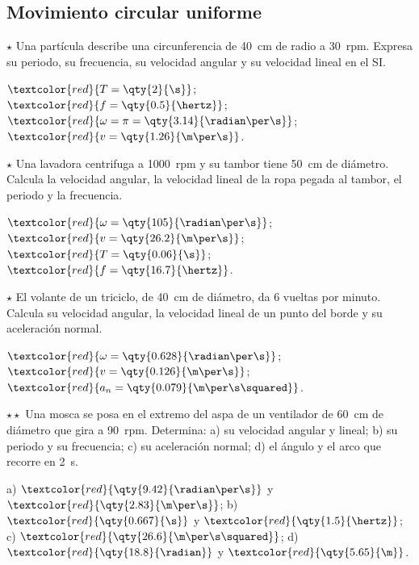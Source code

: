 \subsection{Movimiento circular uniforme}

\begin{exercise}
    \(\star\) Una partícula describe una circunferencia de \qty{40}{\cm} de radio a \qty{30}{rpm}. Expresa su periodo, su frecuencia,
    su velocidad angular y su velocidad lineal en el SI.
    \begin{solu}
        \(\textcolor{red}{T = \qty{2}{\s}}\); \(\textcolor{red}{f = \qty{0.5}{\hertz}}\); \(\textcolor{red}{\omega = \pi = \qty{3.14}{\radian\per\s}}\);
        \(\textcolor{red}{v = \qty{1.26}{\m\per\s}}\).
    \end{solu}
\end{exercise}

\begin{exercise}
    \(\star\) Una lavadora centrifuga a \qty{1000}{rpm} y su tambor tiene \qty{50}{\cm} de diámetro. Calcula la velocidad angular, la
    velocidad lineal de la ropa pegada al tambor, el periodo y la frecuencia.
    \begin{solu}
        \(\textcolor{red}{\omega = \qty{105}{\radian\per\s}}\); \(\textcolor{red}{v = \qty{26.2}{\m\per\s}}\); \(\textcolor{red}{T = \qty{0.06}{\s}}\);
        \(\textcolor{red}{f = \qty{16.7}{\hertz}}\).
    \end{solu}
\end{exercise}

\begin{exercise}
    \(\star\) El volante de un triciclo, de \qty{40}{\cm} de diámetro, da 6 vueltas por minuto. Calcula su velocidad angular, la
    velocidad lineal de un punto del borde y su aceleración normal.
    \begin{solu}
        \(\textcolor{red}{\omega = \qty{0.628}{\radian\per\s}}\); \(\textcolor{red}{v = \qty{0.126}{\m\per\s}}\);
        \(\textcolor{red}{a_n = \qty{0.079}{\m\per\s\squared}}\).
    \end{solu}
\end{exercise}

\begin{exercise}
    \(\star\star\) Una mosca se posa en el extremo del aspa de un ventilador de \qty{60}{\cm} de diámetro que gira a \qty{90}{rpm}.
    Determina: a) su velocidad angular y lineal; b) su periodo y su frecuencia; c) su aceleración normal; d) el ángulo y el arco que
    recorre en \qty{2}{\s}.
    \begin{solu}
        a) \(\textcolor{red}{\qty{9.42}{\radian\per\s}}\) y \(\textcolor{red}{\qty{2.83}{\m\per\s}}\); b) \(\textcolor{red}{\qty{0.667}{\s}}\) y
        \(\textcolor{red}{\qty{1.5}{\hertz}}\); c) \(\textcolor{red}{\qty{26.6}{\m\per\s\squared}}\); d) \(\textcolor{red}{\qty{18.8}{\radian}}\)
        y \(\textcolor{red}{\qty{5.65}{\m}}\).
    \end{solu}
\end{exercise}

